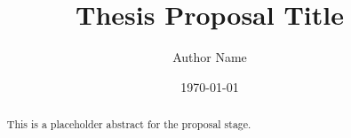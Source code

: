 \documentclass[12pt,a4paper]{ctexart}
\title{Thesis Proposal Title}
\author{Author Name}
\date{\today}
\begin{document}
\maketitle

\begin{abstract}
This is a placeholder abstract for the proposal stage.
\end{abstract}

\tableofcontents
\newpage








\end{document}
